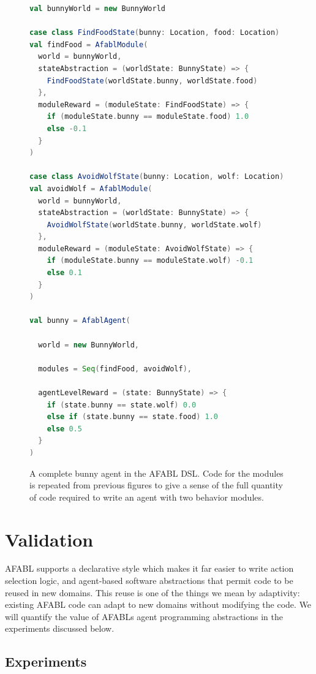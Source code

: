 \begin{figure}[!h]
\begin{center}

\begin{lstlisting}[language=Scala]
val bunnyWorld = new BunnyWorld

case class FindFoodState(bunny: Location, food: Location)
val findFood = AfablModule(
  world = bunnyWorld,
  stateAbstraction = (worldState: BunnyState) => {
    FindFoodState(worldState.bunny, worldState.food)
  },
  moduleReward = (moduleState: FindFoodState) => {
    if (moduleState.bunny == moduleState.food) 1.0
    else -0.1
  }
)

case class AvoidWolfState(bunny: Location, wolf: Location)
val avoidWolf = AfablModule(
  world = bunnyWorld,
  stateAbstraction = (worldState: BunnyState) => {
    AvoidWolfState(worldState.bunny, worldState.wolf)
  },
  moduleReward = (moduleState: AvoidWolfState) => {
    if (moduleState.bunny == moduleState.wolf) -0.1
    else 0.1
  }
)

val bunny = AfablAgent(

  world = new BunnyWorld,

  modules = Seq(findFood, avoidWolf),

  agentLevelReward = (state: BunnyState) => {
    if (state.bunny == state.wolf) 0.0
    else if (state.bunny == state.food) 1.0
    else 0.5
  }
)
\end{lstlisting}

\caption{A complete bunny agent in the AFABL DSL. Code for the modules is repeated from previous figures to give a sense of the full quantity of code required to write an agent with two behavior modules.}
\end{center}
\label{fig:afabl-bunny-code}
\end{figure}


\section{Validation}

AFABL supports a declarative style which makes it far easier to write action selection logic, and agent-based software abstractions that permit code to be reused in new domains. This reuse is one of the things we mean by adaptivity: existing AFABL code can adapt to new domains without modifying the code. We will quantify the value of AFABLs agent programming abstractions in the experiments discussed below.

\subsection{Experiments}

